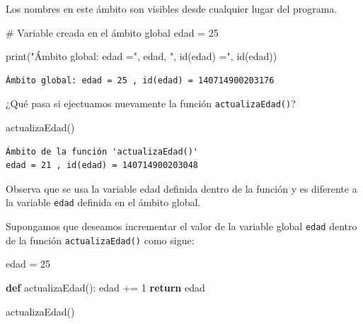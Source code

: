 \documentclass[
  spanish,
  letterpaper,
]{scrbook}
\newenvironment{Shaded}{\begin{snugshade}}{\end{snugshade}}
\newcommand{\BuiltInTok}[1]{\textcolor[rgb]{0.00,0.23,0.31}{#1}}
\newcommand{\CommentTok}[1]{\textcolor[rgb]{0.37,0.37,0.37}{#1}}
\newcommand{\ControlFlowTok}[1]{\textcolor[rgb]{0.00,0.23,0.31}{\textbf{#1}}}
\newcommand{\DecValTok}[1]{\textcolor[rgb]{0.68,0.00,0.00}{#1}}
\newcommand{\KeywordTok}[1]{\textcolor[rgb]{0.00,0.23,0.31}{\textbf{#1}}}
\newcommand{\NormalTok}[1]{\textcolor[rgb]{0.00,0.23,0.31}{#1}}
\newcommand{\OperatorTok}[1]{\textcolor[rgb]{0.37,0.37,0.37}{#1}}
\newcommand{\StringTok}[1]{\textcolor[rgb]{0.13,0.47,0.30}{#1}}
\theoremstyle{definition}
\theoremstyle{remark}
\begin{document}
Los nombres en este ámbito son visibles desde cualquier lugar del
programa.

\begin{Shaded}
\begin{Highlighting}[]
\CommentTok{\# Variable creada en el ámbito global}
\NormalTok{edad }\OperatorTok{=} \DecValTok{25}
\end{Highlighting}
\end{Shaded}

\begin{Shaded}
\begin{Highlighting}[]
\BuiltInTok{print}\NormalTok{(}\StringTok{"Ámbito global: edad ="}\NormalTok{, edad, }\StringTok{", id(edad) ="}\NormalTok{, }\BuiltInTok{id}\NormalTok{(edad))}
\end{Highlighting}
\end{Shaded}

\begin{verbatim}
Ámbito global: edad = 25 , id(edad) = 140714900203176
\end{verbatim}

¿Qué pasa si ejectuamos nuevamente la función \texttt{actualizaEdad()}?

\begin{Shaded}
\begin{Highlighting}[]
\NormalTok{actualizaEdad()}
\end{Highlighting}
\end{Shaded}

\begin{verbatim}
Ámbito de la función 'actualizaEdad()'
edad = 21 , id(edad) = 140714900203048
\end{verbatim}

Observa que se usa la variable edad definida dentro de la función y es
diferente a la variable \texttt{edad} definida en el ámbito global.

Supongamos que deseamos incrementar el valor de la variable global
\texttt{edad} dentro de la función \texttt{actualizaEdad()} como sigue:

\begin{Shaded}
\begin{Highlighting}[]
\NormalTok{edad }\OperatorTok{=} \DecValTok{25}

\KeywordTok{def}\NormalTok{ actualizaEdad():}
\NormalTok{    edad }\OperatorTok{+=} \DecValTok{1}
    \ControlFlowTok{return}\NormalTok{ edad}

\NormalTok{actualizaEdad()}
\end{Highlighting}
\end{Shaded}
\end{document}
